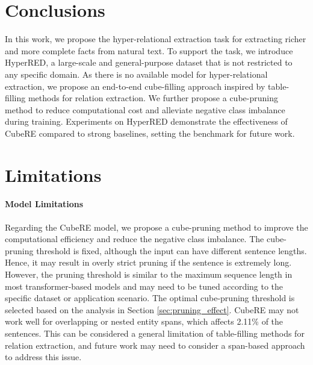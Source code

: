 \documentclass[11pt]{article}
\newcommand{\modelname}{CubeRE}
\newcommand{\dataname}{HyperRED}
\begin{document}
\section{Conclusions}

In this work, we propose the hyper-relational extraction task for extracting richer and more complete facts from natural text. 
To support the task, we introduce \dataname{}, a large-scale and general-purpose dataset that is not restricted to any specific domain.
As there is no available model for hyper-relational extraction, we propose an end-to-end cube-filling approach
inspired by table-filling methods for relation extraction.
We further propose a cube-pruning method to reduce computational cost and alleviate negative class imbalance during training.
Experiments on \dataname{} demonstrate the effectiveness of \modelname{} compared to strong baselines, setting the benchmark for future work.

\section*{Limitations}


\paragraph{Model Limitations}
Regarding the \modelname{} model, we propose a cube-pruning method to improve the computational efficiency and reduce the negative class imbalance. 
The cube-pruning threshold is fixed, although the input can have different sentence lengths.
Hence, it may result in overly strict pruning if the sentence is extremely long. 
However, the pruning threshold is similar to the maximum sequence length in most transformer-based models and may need to be tuned according to the specific dataset or application scenario.
The optimal cube-pruning threshold is selected based on the analysis in Section \ref{sec:pruning_effect}.
\modelname{} may not work well for overlapping or nested entity spans, which affects 2.11\% of the sentences.
This can be considered a general limitation of table-filling methods for relation extraction, and future work may need to consider a span-based approach \cite{xu-etal-2021-learning} to address this issue.
\end{document}
